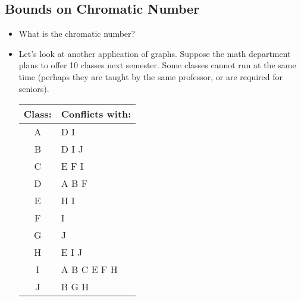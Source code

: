 \documentclass[12pt]{article}
\theoremstyle{plain}
\theoremstyle{definition}
\theoremstyle{remark}
\newcommand{\vtx}[2]{node[fill,circle,inner sep=0pt, minimum size=4pt,label=#1:#2]{}}
\renewcommand{\v}{\vtx{above}{}}
\newcommand{\todayis}[1]{\clearpage{\rhead{\footnotesize #1}}}
\begin{document}
   \todayis{Monday, November 13}



   \subsection*{Bounds on Chromatic Number}



   \begin{itemize}
     \item What is the chromatic number?
     \begin{center}
     \end{center}

     \item Let's look at another application of graphs.  Suppose the math department plans to offer 10 classes next semester.  Some classes cannot run at the same time (perhaps they are taught by the same professor, or are required for seniors).

     \begin{center}
     \begin{tabular}{cl}
     \textbf{Class:} & \textbf{Conflicts with:} \\ \hline
     A & D I \\
     B & D I J \\
     C & E F I \\
     D & A B F \\
     E & H I\\
     F & I\\
     G & J \\
     H & E I J\\
     I & A B C E F H \\
     J & B G H
     \end{tabular}
     \end{center}


\end{itemize}
\end{document}
